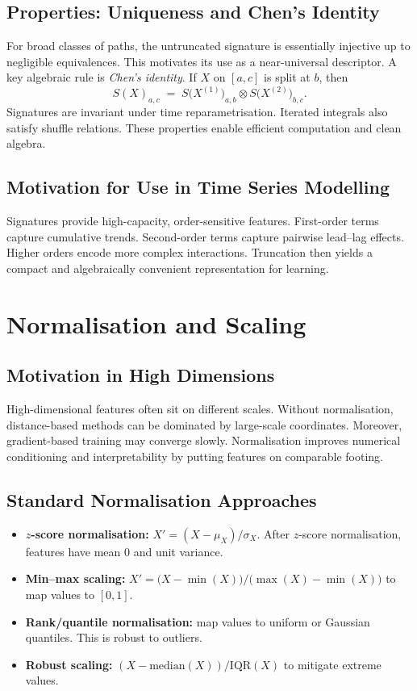 \subsection{Properties: Uniqueness and Chen’s Identity}
For broad classes of paths, the untruncated signature is essentially injective up to negligible equivalences. This motivates its use as a near-universal descriptor. A key algebraic rule is \emph{Chen’s identity}. If $X$ on $[a,c]$ is split at $b$, then
\[
S(X)_{a,c} \;=\; S\!\big(X^{(1)}\big)_{a,b} \otimes S\!\big(X^{(2)}\big)_{b,c}.
\]
Signatures are invariant under time reparametrisation. Iterated integrals also satisfy shuffle relations. These properties enable efficient computation and clean algebra.

\subsection{Motivation for Use in Time Series Modelling}
Signatures provide high-capacity, order-sensitive features. First-order terms capture cumulative trends. Second-order terms capture pairwise lead–lag effects. Higher orders encode more complex interactions. Truncation then yields a compact and algebraically convenient representation for learning.

\section{Normalisation and Scaling}

\subsection{Motivation in High Dimensions}
High-dimensional features often sit on different scales. Without normalisation, distance-based methods can be dominated by large-scale coordinates. Moreover, gradient-based training may converge slowly. Normalisation improves numerical conditioning and interpretability by putting features on comparable footing.

\subsection{Standard Normalisation Approaches}
\begin{itemize}
    \item \textbf{$z$-score normalisation:} $X' = (X-\mu_X)/\sigma_X$. After $z$-score normalisation, features have mean $0$ and unit variance.
    \item \textbf{Min–max scaling:} $X' = \big(X-\min(X)\big)/\big(\max(X)-\min(X)\big)$ to map values to $[0,1]$.
    \item \textbf{Rank/quantile normalisation:} map values to uniform or Gaussian quantiles. This is robust to outliers.
    \item \textbf{Robust scaling:} $(X-\mathrm{median}(X))/\mathrm{IQR}(X)$ to mitigate extreme values.
\end{itemize}

